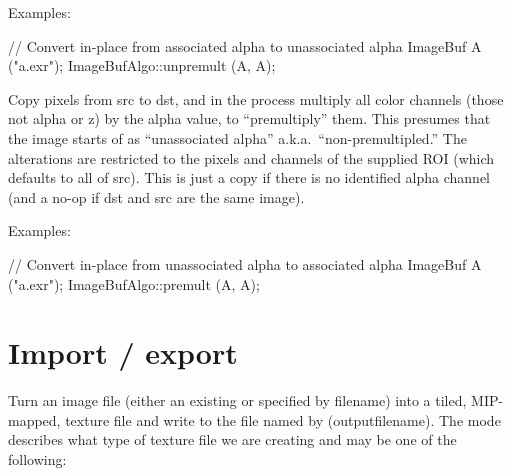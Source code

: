 \smallskip
\noindent Examples:
\begin{code}
    // Convert in-place from associated alpha to unassociated alpha
    ImageBuf A ("a.exr");
    ImageBufAlgo::unpremult (A, A);
\end{code}
\apiend

 
Copy pixels from {\cf src} to {\cf dst}, and in the process 
multiply all color channels (those not alpha or z) 
by the alpha value, to ``premultiply'' them.  This presumes that the
image starts of as ``unassociated alpha'' a.k.a.\ ``non-premultipled.''
The alterations are restricted to the pixels and channels of the
supplied ROI (which defaults to all of {\cf src}).  This is just a copy
if there is no identified alpha channel
(and a no-op if {\cf dst} and {\cf src} are the same image).

\smallskip
\noindent Examples:
\begin{code}
    // Convert in-place from unassociated alpha to associated alpha
    ImageBuf A ("a.exr");
    ImageBufAlgo::premult (A, A);
\end{code}
\apiend



\section{Import / export}
\label{sec:iba:importexport}

 

Turn an image file (either an existing \ImageBuf or specified by {\cf
filename}) into a tiled, MIP-mapped, texture file and write to the
file named by ({\cf outputfilename}).  The {\cf mode} describes what type of texture file we
are creating and may be one of the following:

